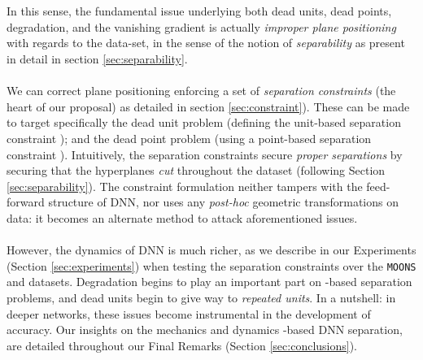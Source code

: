 \\\\
In this sense, the fundamental issue underlying both dead units, dead points, degradation, and the vanishing gradient is actually \emph{improper plane positioning} with regards to the data-set, in the sense of the notion of \emph{separability} as present in detail in section \ref{sec:separability}. 
\\\\
We can correct plane positioning enforcing a set of \emph{separation constraints} (the heart of our proposal) as detailed in section \ref{sec:constraint}). These  can be made to target specifically the dead unit problem (defining the unit-based separation constraint \SepUnit); and the dead point problem (using a point-based separation constraint \SepPoint). Intuitively, the separation constraints secure \emph{proper separations} by securing that the hyperplanes \emph{cut} throughout the dataset (following Section \ref{sec:separability}). The constraint formulation neither tampers with the feed-forward structure of DNN, nor uses any \emph{post-hoc} geometric transformations on data: it becomes an alternate method to attack aforementioned issues. 
\\\\
However, the dynamics of \ReLU DNN is much richer, as we describe in our Experiments (Section \ref{sec:experiments}) when testing the separation constraints over the \texttt{MOONS} and  datasets. Degradation begins to play an important part on \ReLU-based separation problems, and dead units begin to give way to \emph{repeated units}. In a nutshell: in deeper networks, these issues become instrumental in the development of accuracy. Our insights on the mechanics and dynamics \ReLU-based DNN separation, are detailed throughout our Final Remarks (Section \ref{sec:conclusions}).  

